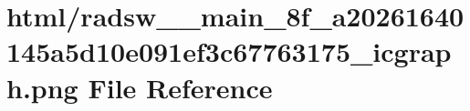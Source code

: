\hypertarget{radsw____main__8f__a20261640145a5d10e091ef3c67763175__icgraph_8png}{}\section{html/radsw\+\_\+\+\_\+main\+\_\+8f\+\_\+a20261640145a5d10e091ef3c67763175\+\_\+icgraph.png File Reference}
\label{radsw____main__8f__a20261640145a5d10e091ef3c67763175__icgraph_8png}
